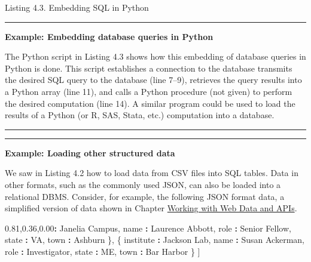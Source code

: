 \documentclass[]{krantz}
\newenvironment{Shaded}{\begin{snugshade}}{\end{snugshade}}
\newcommand{\StringTok}[1]{\textcolor[rgb]{0.31,0.60,0.02}{#1}}
\newcommand{\OperatorTok}[1]{\textcolor[rgb]{0.81,0.36,0.00}{\textbf{#1}}}
\newcommand{\NormalTok}[1]{#1}
\begin{document}
Listing 4.3. Embedding SQL in Python

\begin{center}\rule{0.5\linewidth}{\linethickness}\end{center}

\textbf{Example: Embedding database queries in Python}

The Python script in Listing 4.3 shows how this embedding of database
queries in Python is done. This script establishes a connection to the
database transmits the desired SQL query to the database (line 7--9),
retrieves the query results into a Python array (line 11), and calls a
Python procedure (not given) to perform the desired computation (line
14). A similar program could be used to load the results of a Python (or
R, SAS, Stata, etc.) computation into a database.

\begin{center}\rule{0.5\linewidth}{\linethickness}\end{center}

\begin{center}\rule{0.5\linewidth}{\linethickness}\end{center}

\textbf{Example: Loading other structured data}

We saw in Listing 4.2 how to load data from CSV files into SQL tables.
Data in other formats, such as the commonly used JSON, can also be
loaded into a relational DBMS. Consider, for example, the following JSON
format data, a simplified version of data shown in Chapter
\protect\hyperlink{chap:web}{Working with Web Data and APIs}.

\begin{Shaded}
\begin{Highlighting}[]
\NormalTok{[}
\NormalTok{  \{}
\NormalTok{    institute }\OperatorTok{:}\StringTok{ }\NormalTok{Janelia Campus,}
\NormalTok{    name }\OperatorTok{:}\StringTok{ }\NormalTok{Laurence Abbott,}
\NormalTok{    role }\OperatorTok{:}\StringTok{ }\NormalTok{Senior Fellow,}
\NormalTok{    state }\OperatorTok{:}\StringTok{ }\NormalTok{VA,}
\NormalTok{    town }\OperatorTok{:}\StringTok{ }\NormalTok{Ashburn}
\NormalTok{  \},}
\NormalTok{  \{}
\NormalTok{    institute }\OperatorTok{:}\StringTok{ }\NormalTok{Jackson Lab,}
\NormalTok{    name }\OperatorTok{:}\StringTok{ }\NormalTok{Susan Ackerman,}
\NormalTok{    role }\OperatorTok{:}\StringTok{ }\NormalTok{Investigator,}
\NormalTok{    state }\OperatorTok{:}\StringTok{ }\NormalTok{ME,}
\NormalTok{    town }\OperatorTok{:}\StringTok{ }\NormalTok{Bar Harbor}
\NormalTok{  \}}
\NormalTok{]}
\end{Highlighting}
\end{Shaded}
\end{document}
